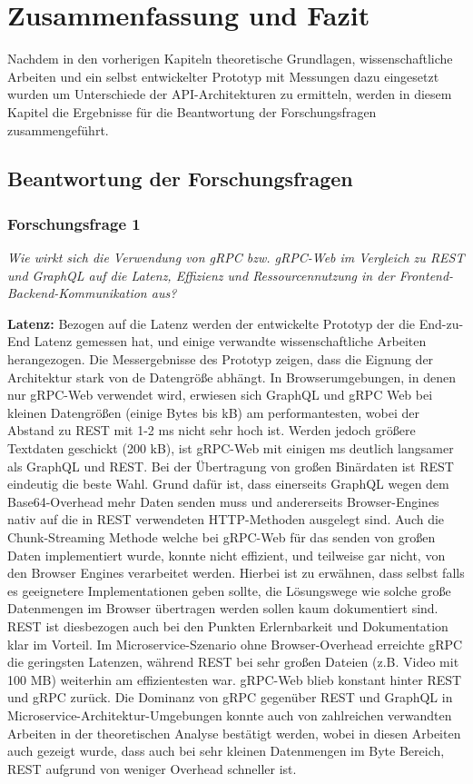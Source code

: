 \chapter{Zusammenfassung und Fazit}
\label{chap:intro}
Nachdem in den vorherigen Kapiteln theoretische Grundlagen, wissenschaftliche Arbeiten und ein selbst entwickelter Prototyp mit Messungen dazu eingesetzt wurden  um Unterschiede der API-Architekturen zu ermitteln, werden in diesem Kapitel die Ergebnisse für die Beantwortung der Forschungsfragen zusammengeführt.
\chapterstart
\section{Beantwortung der Forschungsfragen}
\subsection*{Forschungsfrage 1}
\textit{Wie wirkt sich die Verwendung von gRPC bzw. gRPC-Web im Vergleich zu REST und GraphQL auf die Latenz, Effizienz und Ressourcennutzung in der Frontend-Backend-Kommunikation aus?}

\textbf{Latenz:} 
Bezogen auf die Latenz werden der entwickelte Prototyp der die End-zu-End Latenz gemessen hat, und einige verwandte wissenschaftliche Arbeiten herangezogen.
Die Messergebnisse des Prototyp zeigen, dass die Eignung der Architektur stark von de Datengröße abhängt. 
In Browserumgebungen, in denen nur gRPC-Web verwendet wird, erwiesen sich GraphQL und gRPC Web bei kleinen Datengrößen (einige Bytes bis kB) am performantesten, wobei der Abstand zu REST mit 1-2 ms nicht sehr hoch ist. 
Werden jedoch größere Textdaten geschickt (200 kB), ist gRPC-Web mit einigen ms deutlich langsamer als GraphQL und REST. Bei der Übertragung von großen Binärdaten ist REST eindeutig die beste Wahl. Grund dafür ist, dass einerseits GraphQL wegen dem Base64-Overhead mehr Daten senden muss und andererseits Browser-Engines nativ auf die in REST verwendeten HTTP-Methoden ausgelegt sind. Auch die Chunk-Streaming Methode welche bei gRPC-Web für das senden von großen Daten implementiert wurde, konnte nicht effizient, und teilweise gar nicht, von den Browser Engines verarbeitet werden. Hierbei ist zu erwähnen, dass selbst falls es geeignetere Implementationen geben sollte, die Lösungswege wie solche große Datenmengen im Browser übertragen werden sollen kaum dokumentiert sind. REST ist diesbezogen auch bei den Punkten Erlernbarkeit und Dokumentation klar im Vorteil.
Im Microservice-Szenario ohne Browser-Overhead erreichte gRPC die geringsten Latenzen, während REST bei sehr großen Dateien (z.B. Video mit 100 MB) weiterhin am effizientesten war. gRPC-Web blieb konstant hinter REST und gRPC zurück.
Die Dominanz von gRPC gegenüber REST und GraphQL in Microservice-Architektur-Umgebungen konnte auch von zahlreichen verwandten Arbeiten in der theoretischen Analyse bestätigt werden, wobei in diesen Arbeiten auch gezeigt wurde, dass auch bei sehr kleinen Datenmengen im Byte Bereich, REST aufgrund von weniger Overhead schneller ist.

